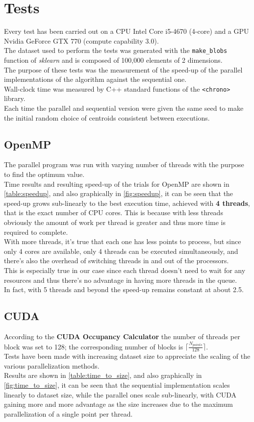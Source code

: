 \documentclass[10pt,twocolumn,letterpaper]{article}
\begin{document}
\section{Tests}
Every test has been carried out on a CPU Intel Core i5-4670 (4-core) and a GPU Nvidia GeForce GTX 770 (compute capability 3.0).\\
The dataset used to perform the tests was generated with the \texttt{make\_blobs} function of \textit{sklearn} and is composed of 100,000 elements of 2 dimensions.\\
The purpose of these tests was the measurement of the speed-up of the parallel implementations of the algorithm against the sequential one.\\
Wall-clock time was measured by C++ standard functions of the \texttt{<chrono>} library.\\
Each time the parallel and sequential version were given the same seed to make the initial random choice of centroids consistent between executions.\\
\subsection{OpenMP}
The parallel program was run with varying number of threads with the purpose to find the optimum value.\\
Time results and resulting speed-up of the trials for OpenMP are shown in \cref{table:speedup}, and also graphically in \cref{fig:speedup}, it can be seen that the speed-up grows sub-linearly to the best execution time, achieved with \textbf{4 threads}, that is the exact number of CPU cores. This is because with less threads obviously the amount of work per thread is greater and thus more time is required to complete.\\ With more threads, it's true that each one has less points to process, but since only 4 cores are available, only 4 threads can be executed simultaneously, and there's also the overhead of switching threads in and out of the processors.\\
This is especially true in our case since each thread doesn't need to wait for any resources and thus there's no advantage in having more threads in the queue.\\
In fact, with 5 threads and beyond the speed-up remains constant at about 2.5.
\subsection{CUDA}
According to the \textbf{CUDA Occupancy Calculator} the number of threads per block was set to 128; the corresponding number of blocks is $\lceil \frac{N_{points}}{128} \rceil$.\\
Tests have been made with increasing dataset size to appreciate the scaling of the various parallelization methods.\\
Results are shown in \cref{table:time_to_size}, and also graphically in \cref{fig:time_to_size}, it can be seen that the sequential implementation scales linearly to dataset size, while the parallel ones scale sub-linearly, with CUDA gaining more and more advantage as the size increases due to the maximum parallelization of a single point per thread.\\
\end{document}
